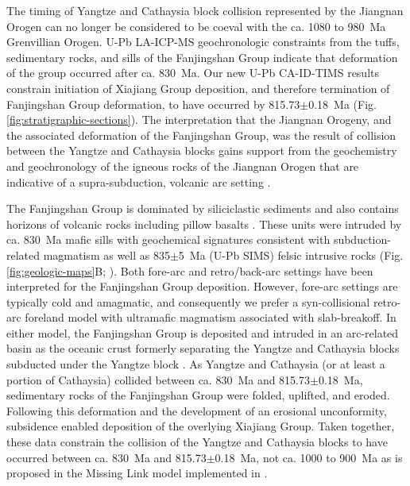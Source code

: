 The timing of Yangtze and Cathaysia block collision represented by the Jiangnan Orogen can no longer be considered to be coeval with the ca. 1080 to 980~Ma Grenvillian Orogen. U-Pb LA-ICP-MS geochronologic constraints from the tuffs, sedimentary rocks, and sills of the Fanjingshan Group \citep{Zhao2011a, Wang2012d, Gao2014a} indicate that deformation of the group occurred after ca. 830~Ma. Our new U-Pb CA-ID-TIMS results constrain initiation of Xiajiang Group deposition, and therefore termination of Fanjingshan Group deformation, to have occurred by 815.73$\pm$0.18~Ma (Fig. \ref{fig:stratigraphic-sections}). The interpretation that the Jiangnan Orogeny, and the associated deformation of the Fanjingshan Group, was the result of collision between the Yangtze and Cathaysia blocks gains support from the geochemistry and geochronology of the igneous rocks of the Jiangnan Orogen that are indicative of a supra-subduction, volcanic arc setting \citep{Cawood2013a, Cawood2017a}.

The Fanjingshan Group is dominated by siliciclastic sediments and also contains horizons of volcanic rocks including pillow basalts \citep{Zhou2009a}. These units were intruded by ca. 830~Ma mafic sills with geochemical signatures consistent with subduction-related magmatism \citep{Wang2014a} as well as 835$\pm$5~Ma (U-Pb SIMS) felsic intrusive rocks (Fig. \ref{fig:geologic-maps}B; \citealp{Gao2011a}). Both fore-arc \citep{Zhao2011a} and retro/back-arc \citep{Lin2016a, Yao2019a} settings have been interpreted for the Fanjingshan Group deposition. However, fore-arc settings are typically cold and amagmatic, and consequently we prefer a syn-collisional retro-arc foreland model with ultramafic magmatism associated with slab-breakoff. In either model, the Fanjingshan Group is deposited and intruded in an arc-related basin as the oceanic crust formerly separating the Yangtze and Cathaysia blocks subducted under the Yangtze block \citep{Lin2016a}. As Yangtze and Cathaysia (or at least a portion of Cathaysia) collided between ca. 830~Ma and 815.73$\pm$0.18~Ma, sedimentary rocks of the Fanjingshan Group were folded, uplifted, and eroded. Following this deformation and the development of an erosional unconformity, subsidence enabled deposition of the overlying Xiajiang Group. Taken together, these data constrain the collision of the Yangtze and Cathaysia blocks to have occurred between ca. 830~Ma and 815.73$\pm$0.18~Ma, not ca. 1000 to 900~Ma as is proposed in the Missing Link model implemented in \citet{Li2008a}.

